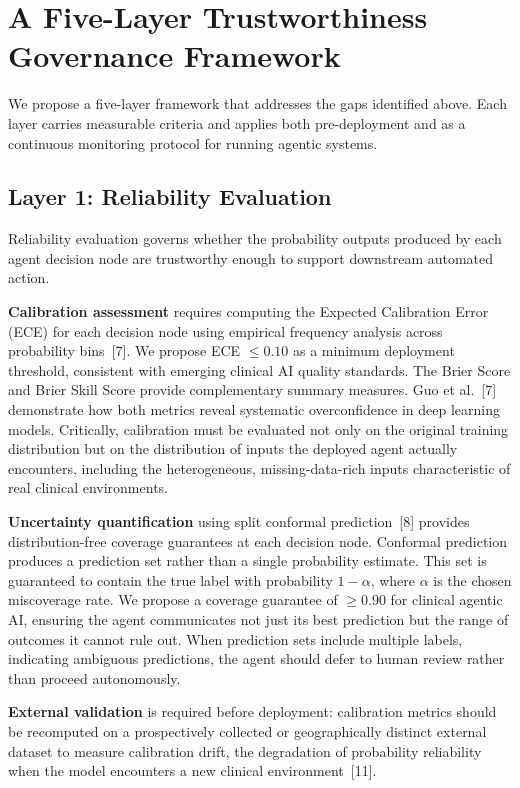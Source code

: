 \section{A Five-Layer Trustworthiness Governance
Framework}\label{a-five-layer-trustworthiness-governance-framework}

We propose a five-layer framework that addresses the gaps identified
above. Each layer carries measurable criteria and applies both
pre-deployment and as a continuous monitoring protocol for running
agentic systems.

\subsection{Layer 1: Reliability Evaluation}\label{layer-1-reliability-evaluation}

Reliability evaluation governs whether the probability outputs produced
by each agent decision node are trustworthy enough to support downstream
automated action.

\textbf{Calibration assessment} requires computing the Expected
Calibration Error (ECE) for each decision node using empirical frequency
analysis across probability bins~{[}7{]}. We propose ECE $\leq 0.10$ as a
minimum deployment threshold, consistent with emerging clinical AI
quality standards. The Brier Score and Brier Skill Score provide
complementary summary measures. Guo et al.~{[}7{]} demonstrate how both
metrics reveal systematic overconfidence in deep learning models.
Critically, calibration must be evaluated not only on the original
training distribution but on the distribution of inputs the deployed
agent actually encounters, including the heterogeneous,
missing-data-rich inputs characteristic of real clinical environments.

\textbf{Uncertainty quantification} using split conformal
prediction~{[}8{]} provides distribution-free coverage guarantees at each
decision node. Conformal prediction produces a prediction set rather
than a single probability estimate. This set is guaranteed to contain
the true label with probability $1-\alpha$, where $\alpha$ is the chosen
miscoverage rate. We propose a coverage guarantee of $\geq 0.90$ for
clinical agentic AI, ensuring the agent communicates not just its best
prediction but the range of outcomes it cannot rule out. When prediction
sets include multiple labels, indicating ambiguous predictions, the
agent should defer to human review rather than proceed autonomously.

\textbf{External validation} is required before deployment: calibration
metrics should be recomputed on a prospectively collected or
geographically distinct external dataset to measure calibration drift,
the degradation of probability reliability when the model encounters a
new clinical environment~{[}11{]}.

